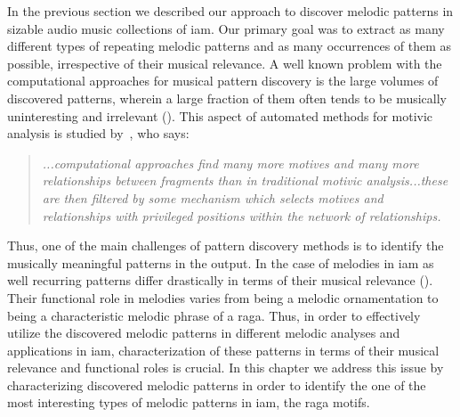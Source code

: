 In the previous section we described our approach to discover melodic patterns in sizable audio music collections of \gls{iam}. Our primary goal was to extract as many different types of repeating melodic patterns and as many occurrences of them as possible, irrespective of their musical relevance. A well known problem with the computational approaches for musical pattern discovery is the large volumes of discovered patterns, wherein a large fraction of them often tends to be musically uninteresting and irrelevant (). This aspect of automated methods for motivic analysis is studied by~\cite{marsden2012counselling}, who says:

\blockquote{\textit{...computational approaches find many more motives and many more relationships between fragments than in traditional motivic analysis...these are then filtered by some mechanism which selects motives and relationships with privileged positions within the network of relationships.}}

Thus, one of the main challenges of pattern discovery methods is to identify the musically meaningful patterns in the output. In the case of melodies in \gls{iam} as well recurring patterns differ drastically in terms of their musical relevance (). Their functional role in melodies varies from being a melodic ornamentation to being a characteristic melodic phrase of a \gls{raga}. Thus, in order to effectively utilize the discovered melodic patterns in different melodic analyses and applications in \gls{iam}, characterization of these patterns in terms of their musical relevance and functional roles is crucial. In this chapter we address this issue by characterizing discovered melodic patterns in order to identify the one of the most interesting types of melodic patterns in \gls{iam}, the \gls{raga} motifs.
 
